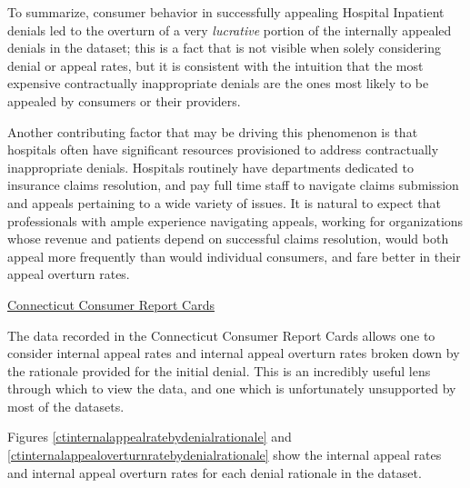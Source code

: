 \documentclass[12pt, a4paper,twoside]{report}
\theoremstyle{plain} %
\theoremstyle{definition} %
\theoremstyle{remark} %
\numberwithin{equation}{chapter}
\begin{document}
		To summarize, consumer behavior in successfully appealing Hospital Inpatient denials led to the overturn of a very \emph{lucrative} portion of the internally appealed denials in the dataset; this is a fact that is not visible when solely considering denial or appeal rates, but it is consistent with the intuition that the most expensive contractually inappropriate denials are the ones most likely to be appealed by consumers or their providers.
		
		Another contributing factor that may be driving this phenomenon is that hospitals often have significant resources provisioned to address contractually inappropriate denials. Hospitals routinely have departments dedicated to insurance claims resolution, and pay full time staff to navigate claims submission and appeals pertaining to a wide variety of issues. It is natural to expect that professionals with ample experience navigating appeals, working for organizations whose revenue and patients depend on successful claims resolution, would both appeal more frequently than would individual consumers, and fare better in their appeal overturn rates.
		
		\underline{Connecticut Consumer Report Cards}
		
		The data recorded in the Connecticut Consumer Report Cards allows one to consider internal appeal rates and internal appeal overturn rates broken down by the rationale provided for the initial denial. This is an incredibly useful lens through which to view the data, and one which is unfortunately unsupported by most of the datasets.
		
		Figures \ref{ctinternalappealratebydenialrationale} and \ref{ctinternalappealoverturnratebydenialrationale} show the internal appeal rates and internal appeal overturn rates for each denial rationale in the dataset.
		
\end{document}
